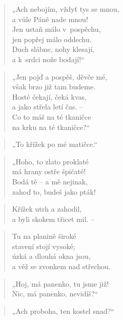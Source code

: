 \begin{verse}
„Ach nebojím, vždyť tys se mnou, \\
a vůle Páně nade mnou! \\
Jen ustaň málo v~pospěchu, \\
jen popřej málo oddechu. \\
Duch slábne, nohy klesají, \\
a k~srdci nože bodají!“
\end{verse}

\begin{verse}
„Jen pojď a pospěš, děvče mé, \\
však brzo již tam budeme. \\
Hosté čekají, čeká kvas, \\
a jako střela letí čas. -- \\
Co to máš na té tkaničce \\
na krku na té tkaničce?“
\end{verse}

\begin{verse}
„To křížek po mé matičce.“
\end{verse}

\begin{verse}
„Hoho, to zlato proklaté \\
má hrany ostře špičaté! \\
Bodá tě -- a mě nejinak, \\
zahoď to, budeš jako pták!
\end{verse}

\begin{verse}
Křížek utrh a zahodil, \\
a byli skokem třicet mil. --
\end{verse}

\begin{verse}
Tu na planině široké \\
stavení stojí vysoké; \\
úzká a dlouhá okna jsou, \\
a věž se zvonkem nad střechou.
\end{verse}

\begin{verse}
„Hoj, má panenko, tu jsme již! \\
Nic, má panenko, nevidíš?“
\end{verse}

\begin{verse}
„Ach proboha, ten kostel snad?“
\end{verse}

